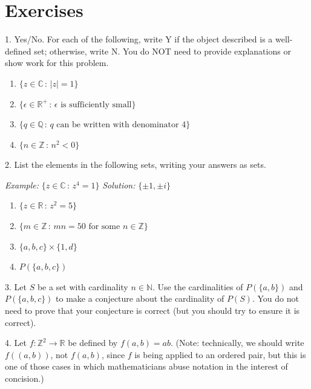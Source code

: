 \documentclass[10pt,openany,oneside]{book}
\theoremstyle{plain}
\theoremstyle{definition}
\theoremstyle{definition}
\theoremstyle{definition}
\theoremstyle{definition}
\numberwithin{equation}{section}
\def\Z{\mathbb{Z}}
\def\R{\mathbb{R}}
\def\Q{\mathbb{Q}}
\def\C{\mathbb{C}}
\def\N{\mathbb{N}}
\newcommand{\lt}{<}
\begin{document}
\section[{Exercises}]{Exercises}\label{exercises-1}
\begin{exerciselist}
\item[1.]\hypertarget{exercise-1}{}Yes/No. For each of the following, write Y if the object described is a well-defined set; otherwise, write N. You do NOT need to provide explanations or show work for this problem. \leavevmode%
\begin{enumerate}[label=(\alph*)]
\item\hypertarget{li-23}{}\(\{z \in \C \,:\, |z|=1\}\)%
\item\hypertarget{li-24}{}\(\{\epsilon \in \R^+\,:\, \epsilon \mbox{ is sufficiently small} \}\)%
\item\hypertarget{li-25}{}\(\{q\in \Q \,:\, q \mbox{ can be written  with denominator } 4\}\)%
\item\hypertarget{li-26}{}\(\{n \in \Z\,:\, n^2 \lt 0\}\)%
\end{enumerate}
%
\par\smallskip
\item[2.]\hypertarget{exercise-2}{}List the elements in the following sets, writing your answers as sets.%
\par
\emph{Example:} \(\{z\in \C\,:\,z^4=1\}\) \emph{Solution:} \(\{\pm 1, \pm i\}\) \leavevmode%
\begin{enumerate}[label=(\alph*)]
\item\hypertarget{li-31}{}\(\{z\in \R\,:\, z^2=5\}\)%
\item\hypertarget{li-32}{}\(\{m \in \Z\,:\, mn=50 \mbox{ for some } n\in \Z\}\)%
\item\hypertarget{li-33}{}\(\{a,b,c\}\times \{1,d\}\)%
\item\hypertarget{li-34}{}\(P(\{a,b,c\})\)%
\end{enumerate}
%
\par\smallskip
\item[3.]\hypertarget{exercise-3}{}Let \(S\) be a set with cardinality \(n\in \N\). Use the cardinalities of \(P(\{a,b\})\) and \(P(\{a,b,c\})\) to make a conjecture about the cardinality of \(P(S)\). You do not need to prove that your conjecture is correct (but you should try to ensure it is correct).%
\par\smallskip
\item[4.]\hypertarget{exercise-4}{}Let \(f: \Z^2 \to \R\) be defined by \(f(a,b)=ab\). (Note: technically, we should write \(f((a,b))\), not \(f(a,b)\), since \(f\) is being applied to an ordered pair, but this is one of those cases in which mathematicians abuse notation in the interest of concision.) \leavevmode%

\end{exerciselist}
\end{document}
